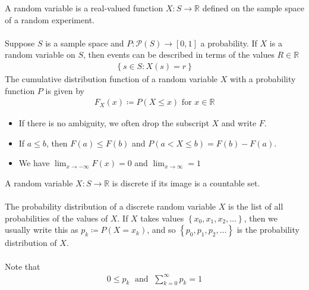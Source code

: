 \documentclass{report}
\begin{document}
\begin{enumerate}
	A random variable is a real-valued function $X: S \to \mathbb{R}$ defined on the sample space of a random experiment.
	\\ \\
	Suppose $S$ is a sample space and $P: \mathcal{P}(S) \to [0,1]$ a probability. If $X$ is a random variable on $S$, then events can be described in terms of the values $R \in \mathbb{R}$
	\begin{align*}
		\left\{s \in S: X(s) = r \right\}
	\end{align*}
	The cumulative distribution function of a random variable $X$ with a probability function $P$ is given by
	\begin{align*}
		F_X(x) \coloneq P(X \leq x) \text{ for } x \in \mathbb{R}
	\end{align*}
	\begin{itemize}
		\item If there is no ambiguity, we often  drop the subscript $X$ and write $F$.
		\item If $a \leq b$, then $F(a) \leq F(b)$ and $P(a < X \leq b) = F(b) - F(a)$.
		\item We have $\displaystyle\lim_{x \to -\infty} F(x) = 0$ and $\displaystyle\lim_{x \to \infty} = 1$
	\end{itemize}

	A random variable $X: S \to \mathbb{R}$ is discrete if its image is a countable set.
	\\ \\
	The probability distribution of a discrete random variable $X$ is the list of all probabilities of the values of $X$. If $X$ takes values $\left\{x_0,x_1,x_2,\dots \right\}$, then we usually write this as $p_k \coloneq P(X = x_k)$, and so $\left\{p_0,p_1,p_2,\dots\right\}$ is the probability distribution of $X$.
	\\ \\
	Note that 
	\begin{align*}
		0 \leq p_k \; \text{ and } \; \sum_{k=0}^\infty p_k = 1
	\end{align*}


\end{enumerate}
\end{document}
